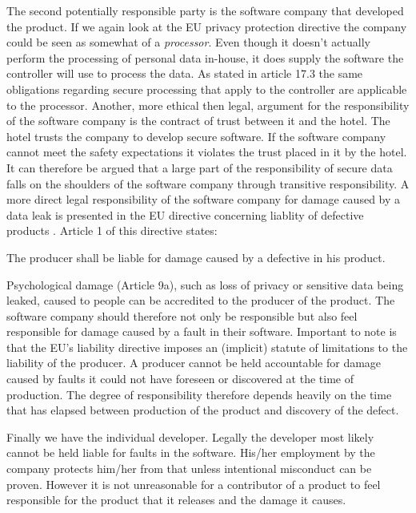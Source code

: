 The second potentially responsible party is the software company that developed the product. If we again look at the EU privacy protection directive \cite{privacy_directive} the company could be seen as somewhat of a  \textit{processor}. Even though it doesn't actually perform the processing of personal data in-house, it does supply the software the controller will use to process the data. As stated in article 17.3 the same obligations regarding secure processing that apply to the controller are applicable to the processor. Another, more ethical then legal, argument for the responsibility of the software company is the contract of trust between it and the hotel. The hotel trusts the company to develop secure software. If the software company cannot meet the safety expectations it violates the trust placed in it by the hotel. It can therefore be argued that a large part of the responsibility of secure data falls on the shoulders of the software company through transitive responsibility. A more direct legal responsibility of the software company for damage caused by a data leak is presented in the EU directive concerning liablity of defective products \cite{liability_directive}. Article 1 of this directive states:

\begin{displayquote}The producer shall be liable for damage caused by a defective in his product.\end{displayquote}

Psychological damage (Article 9a), such as loss of privacy or sensitive data being leaked, caused to people can be accredited to the producer of the product. The software company should therefore not only be responsible but also feel responsible for damage caused by a fault in their software.
Important to note is that the EU's liability directive \cite{liability_directive} imposes an (implicit) statute of limitations to the liability of the producer. A producer cannot be held accountable for damage caused by faults it could not have foreseen or discovered at the time of production. The degree of responsibility therefore depends heavily on the time that has elapsed between production of the product and discovery of the defect.

Finally we have the individual developer. Legally the developer most likely cannot be held liable for faults in the software. His/her employment by the company protects him/her from that unless intentional misconduct can be proven. However it is not unreasonable for a contributor of a product to feel responsible for the product that it releases and the damage it causes.

